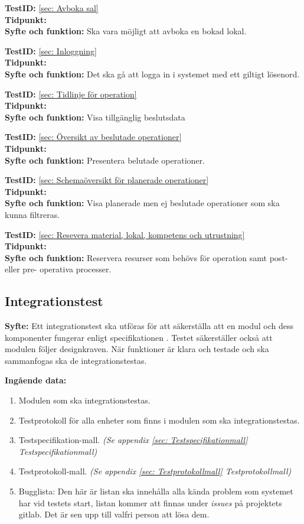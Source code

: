 \documentclass[a4paper,10pt, twoside]{article}
\begin{document}
  \textbf{TestID:} \ref{sec: Avboka sal}
  \\ \textbf{Tidpunkt:}
  \\ \textbf{Syfte och funktion:} Ska vara möjligt att avboka en bokad lokal.
  
  \textbf{TestID:} \ref{sec: Inloggning}
  \\ \textbf{Tidpunkt:}  
  \\ \textbf{Syfte och funktion:} Det ska gå att logga in i systemet med ett giltigt lösenord.
  
  \textbf{TestID:} \ref{sec: Tidlinje för operation}
  \\ \textbf{Tidpunkt:}
  \\ \textbf{Syfte och funktion:} Visa tillgänglig beslutsdata

  \textbf{TestID:} \ref{sec: Översikt av beslutade operationer}
  \\ \textbf{Tidpunkt:}  
  \\ \textbf{Syfte och funktion:} Presentera belutade operationer.

  \textbf{TestID:} \ref{sec: Schemaöversikt för planerade operationer}
  \\ \textbf{Tidpunkt:}  
  \\ \textbf{Syfte och funktion:} Visa planerade men ej beslutade operationer som ska kunna filtreras.
  
  \textbf{TestID:} \ref{sec: Resevera material, lokal, kompetens och utrustning}
  \\ \textbf{Tidpunkt:}
  \\ \textbf{Syfte och funktion:} Reservera resurser som behövs för operation samt post- eller pre-					operativa processer.

\subsection{Integrationstest}
\label{sec:Integrationstest}
\textbf{Syfte:} Ett integrationstest ska utföras för att säkerställa att en modul och dess komponenter fungerar enligt specifikationen \cite{kravspec}. Testet säkerställer också att modulen följer designkraven. När funktioner är klara och testade och ska sammanfogas ska de integrationstestas.

\textbf{Ingående data:}
\begin{enumerate}
	\item Modulen som ska integrationstestas.
    \item Testprotokoll för alla enheter som finns i modulen som ska integrationstestas.
    \item Testspecifikation-mall. \emph{(Se appendix \ref{sec: Testspecifikationmall} 				{Testspecifikationmall})}
    \item Testprotokoll-mall. \emph{(Se appendix \ref{sec: Testprotokollmall} Testprotokollmall)}
    \item Bugglista: Den här är listan ska innehålla alla kända problem som systemet har vid testets 			  start, listan kommer att finnas under \emph{issues} på projektets gitlab. Det är sen upp    			  till valfri person att lösa dem.
\end{enumerate}
\end{document}
